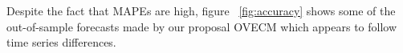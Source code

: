 

%

Despite the fact that MAPEs are high, figure ~\ref{fig:accuracy} shows some of
the out-of-sample forecasts made by our proposal OVECM which appears to follow
time series differences. 

